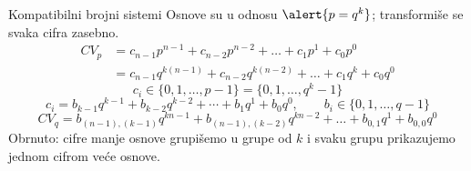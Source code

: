 \begin{frame}[label=04-s016]{Kompatibilni brojni sistemi}
\setlength{\abovedisplayskip}{3pt}\setlength{\belowdisplayskip}{3pt}
Osnove su u odnosu $\alert{p=q^k}$; transformiše se svaka cifra zasebno.
\[\begin{aligned}CV_p&=c_{n-1}p^{n-1}+c_{n-2}p^{n-2}+\ldots+c_1p^1+c_0p^0\\
&=c_{n-1}q^{k(n-1)}+c_{n-2}q^{k(n-2)}+\ldots+c_1q^k+c_0q^0\end{aligned}\]
\[c_i\in\{0,1,\ldots,p-1\}=\{0,1,\ldots,q^k-1\}\]
\[c_i=b_{k-1}q^{k-1}+b_{k-2}q^{k-2}+\cdots+b_1q^1+b_0q^0,\qquad b_i\in\{0,1,\ldots,q-1\}\]
\[CV_q=b_{(n-1),(k-1)}q^{kn-1}+b_{(n-1),(k-2)}q^{kn-2}+\ldots+b_{0,1}q^1+b_{0,0}q^0\]
Obrnuto: cifre manje osnove grupišemo u grupe od $k$ i svaku grupu prikazujemo jednom cifrom veće osnove.
\end{frame}
